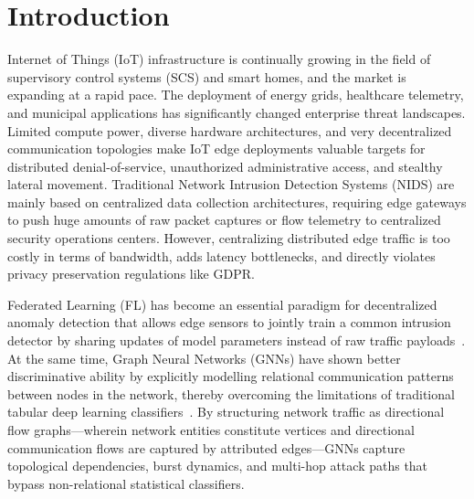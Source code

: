 \documentclass[journal,onecolumn]{IEEEtran}
\begin{document}
\section{Introduction}
\label{sec:introduction}

 Internet of Things (IoT) infrastructure is continually growing in the field of supervisory control systems (SCS) and smart homes, and the market is expanding at a rapid pace. The deployment of energy grids, healthcare telemetry, and municipal applications has significantly changed enterprise threat landscapes. Limited compute power, diverse hardware architectures, and very decentralized communication topologies make IoT edge deployments valuable targets for distributed denial-of-service, unauthorized administrative access, and stealthy lateral movement. Traditional Network Intrusion Detection Systems (NIDS) are mainly based on centralized data collection architectures, requiring edge gateways to push huge amounts of raw packet captures or flow telemetry to centralized security operations centers. However, centralizing distributed edge traffic is too costly in terms of bandwidth, adds latency bottlenecks, and directly violates privacy preservation regulations like GDPR.

Federated Learning (FL) has become an essential paradigm for decentralized anomaly detection that allows edge sensors to jointly train a common intrusion detector by sharing updates of model parameters instead of raw traffic payloads~\cite{mcmahan2017federated}. At the same time, Graph Neural Networks (GNNs) have shown better discriminative ability by explicitly modelling relational communication patterns between nodes in the network, thereby overcoming the limitations of traditional tabular deep learning classifiers~\cite{velickovic2018gat, hamilton2017graphsage}. By structuring network traffic as directional flow graphs—wherein network entities constitute vertices and directional communication flows are captured by attributed edges—GNNs capture topological dependencies, burst dynamics, and multi-hop attack paths that bypass non-relational statistical classifiers.
\end{document}
